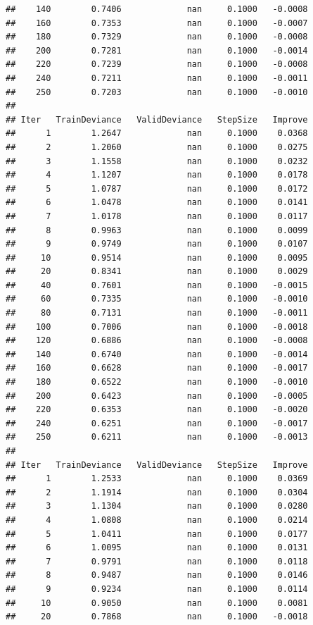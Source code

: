 \documentclass[]{book}
\begin{document}
\begin{verbatim}
##    140        0.7406             nan     0.1000   -0.0008
##    160        0.7353             nan     0.1000   -0.0007
##    180        0.7329             nan     0.1000   -0.0008
##    200        0.7281             nan     0.1000   -0.0014
##    220        0.7239             nan     0.1000   -0.0008
##    240        0.7211             nan     0.1000   -0.0011
##    250        0.7203             nan     0.1000   -0.0010
## 
## Iter   TrainDeviance   ValidDeviance   StepSize   Improve
##      1        1.2647             nan     0.1000    0.0368
##      2        1.2060             nan     0.1000    0.0275
##      3        1.1558             nan     0.1000    0.0232
##      4        1.1207             nan     0.1000    0.0178
##      5        1.0787             nan     0.1000    0.0172
##      6        1.0478             nan     0.1000    0.0141
##      7        1.0178             nan     0.1000    0.0117
##      8        0.9963             nan     0.1000    0.0099
##      9        0.9749             nan     0.1000    0.0107
##     10        0.9514             nan     0.1000    0.0095
##     20        0.8341             nan     0.1000    0.0029
##     40        0.7601             nan     0.1000   -0.0015
##     60        0.7335             nan     0.1000   -0.0010
##     80        0.7131             nan     0.1000   -0.0011
##    100        0.7006             nan     0.1000   -0.0018
##    120        0.6886             nan     0.1000   -0.0008
##    140        0.6740             nan     0.1000   -0.0014
##    160        0.6628             nan     0.1000   -0.0017
##    180        0.6522             nan     0.1000   -0.0010
##    200        0.6423             nan     0.1000   -0.0005
##    220        0.6353             nan     0.1000   -0.0020
##    240        0.6251             nan     0.1000   -0.0017
##    250        0.6211             nan     0.1000   -0.0013
## 
## Iter   TrainDeviance   ValidDeviance   StepSize   Improve
##      1        1.2533             nan     0.1000    0.0369
##      2        1.1914             nan     0.1000    0.0304
##      3        1.1304             nan     0.1000    0.0280
##      4        1.0808             nan     0.1000    0.0214
##      5        1.0411             nan     0.1000    0.0177
##      6        1.0095             nan     0.1000    0.0131
##      7        0.9791             nan     0.1000    0.0118
##      8        0.9487             nan     0.1000    0.0146
##      9        0.9234             nan     0.1000    0.0114
##     10        0.9050             nan     0.1000    0.0081
##     20        0.7868             nan     0.1000   -0.0018

\end{verbatim}
\end{document}
